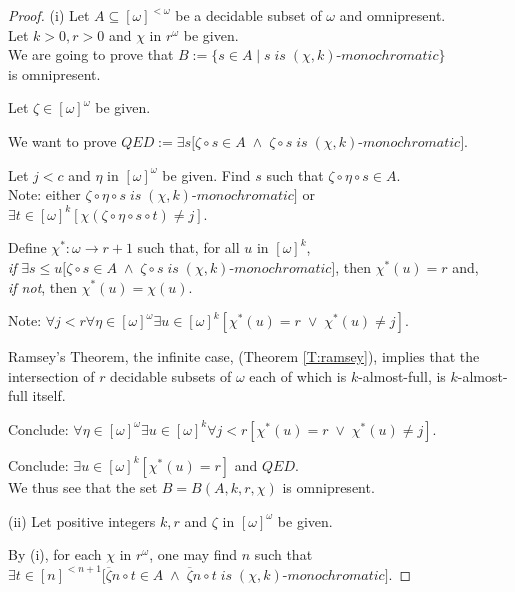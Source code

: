 \documentclass[a4paper]{amsart}
\theoremstyle{plain}
\begin{document}
	 \begin{proof} (i) Let $A\subseteq [\omega]^{<\omega}$ be a decidable subset of $\omega$ and  omnipresent. \\Let $k>0, r>0$ and $\chi$ in $r^\omega$ be given. \\We are going to prove that $B:=\{s\in A\mid s \;is\; (\chi, k)$-$monochromatic\}$ \\is omnipresent.
	 
	 \smallskip Let $\zeta \in [\omega]^\omega$ be given.
	 
	  We want to prove $QED:= \exists s[\zeta\circ s \in A\;\wedge\;\zeta\circ s \;is\; (\chi,k)$-$monochromatic]$.
	  
	 Let $j<c$ and $\eta$ in $[\omega]^\omega$ be given. Find $s$ such that $\zeta\circ \eta \circ s  \in A$.\\ Note: either $\zeta\circ\eta\circ s \;is\; (\chi,k)$-$monochromatic]$ or $\exists t \in [\omega]^k[\chi(\zeta\circ \eta\circ s\circ t)\neq j]$.
	
	Define $\chi^\ast:\omega\rightarrow r+1$ such that, for  all $u$ in $[\omega]^k$, \\{\it if} $\exists s\le u[\zeta \circ s \in A\;\wedge\; \zeta\circ s \; is\; (\chi,k)$-$monochromatic]$, then $\chi^\ast(u)=r$ and, \\{\it if not}, then $\chi^\ast(u)=\chi(u)$. 
	
	Note: $\forall j<r\forall \eta \in [\omega]^\omega \exists u \in [\omega]^k[\chi^\ast (u)= r \;\vee\; \chi^\ast(u) \neq j]$.
	
	 Ramsey's Theorem, the infinite case, (Theorem \ref{T:ramsey}), implies that the intersection of $r$ decidable subsets of $\omega$ each of which is $k$-almost-full, is $k$-almost-full itself. 
	 
	 Conclude:  $\forall \eta \in [\omega]^\omega \exists u \in [\omega]^k\forall j<r[\chi^\ast (u)= r \;\vee\; \chi^\ast(u) \neq j]$. 
	
	Conclude: $\exists u \in [\omega]^k[\chi^\ast(u)=r]$ and $QED$. 
	\\We thus see that the set $B=B(A,k,r,\chi)$  is omnipresent.
	
	
	\smallskip (ii) Let positive integers $k,r$ and $\zeta$ in $[\omega]^\omega$ be given.
	
	By (i), for each $\chi$ in $r^\omega$, one may find $n$ such that \\$\exists t \in [n]^{<n+1}[\overline \zeta n \circ t \in A \;\wedge\; \overline \zeta n \circ t \;is\;(\chi, k)$-$monochromatic]$. 
	

\end{proof}
\end{document}
